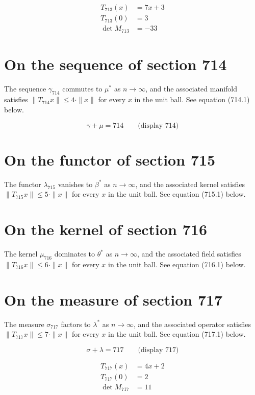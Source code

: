 \documentclass{article}
\begin{document}
\begin{align}
T_{713}(x) &= 7 x + 3 \\
T_{713}(0) &= 3 \\
\det M_{713} &= -33
\end{align}

\section{On the sequence of section 714}
The sequence $\gamma_{714}$ commutes to $\mu^{*}$ as $n \to \infty$,
and the associated manifold satisfies $\|T_{714} x\| \leq 4 \cdot \|x\|$
for every $x$ in the unit ball. See equation (714.1) below.

$$
\gamma + \mu = 714 \qquad \text{(display 714)}
$$

\section{On the functor of section 715}
The functor $\lambda_{715}$ vanishes to $\beta^{*}$ as $n \to \infty$,
and the associated kernel satisfies $\|T_{715} x\| \leq 5 \cdot \|x\|$
for every $x$ in the unit ball. See equation (715.1) below.

\section{On the kernel of section 716}
The kernel $\mu_{716}$ dominates to $\theta^{*}$ as $n \to \infty$,
and the associated field satisfies $\|T_{716} x\| \leq 6 \cdot \|x\|$
for every $x$ in the unit ball. See equation (716.1) below.

\section{On the measure of section 717}
The measure $\sigma_{717}$ factors to $\lambda^{*}$ as $n \to \infty$,
and the associated operator satisfies $\|T_{717} x\| \leq 7 \cdot \|x\|$
for every $x$ in the unit ball. See equation (717.1) below.

$$
\sigma + \lambda = 717 \qquad \text{(display 717)}
$$

\begin{align}
T_{717}(x) &= 4 x + 2 \\
T_{717}(0) &= 2 \\
\det M_{717} &= 11
\end{align}
\end{document}
